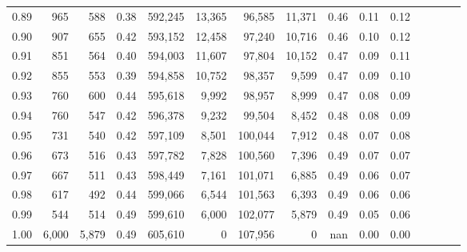 \begin{tabular}{rrrcrrrrrrrrrrr}
0.89 &     965 &    588 &                                       0.38 &  592,245 &   13,365 &   96,585 &   11,371 &  0.46 &  0.11 &                         0.12 \\
0.90 &     907 &    655 &                                       0.42 &  593,152 &   12,458 &   97,240 &   10,716 &  0.46 &  0.10 &                         0.12 \\
0.91 &     851 &    564 &                                       0.40 &  594,003 &   11,607 &   97,804 &   10,152 &  0.47 &  0.09 &                         0.11 \\
0.92 &     855 &    553 &                                       0.39 &  594,858 &   10,752 &   98,357 &    9,599 &  0.47 &  0.09 &                         0.10 \\
0.93 &     760 &    600 &                                       0.44 &  595,618 &    9,992 &   98,957 &    8,999 &  0.47 &  0.08 &                         0.09 \\
0.94 &     760 &    547 &                                       0.42 &  596,378 &    9,232 &   99,504 &    8,452 &  0.48 &  0.08 &                         0.09 \\
0.95 &     731 &    540 &                                       0.42 &  597,109 &    8,501 &  100,044 &    7,912 &  0.48 &  0.07 &                         0.08 \\
0.96 &     673 &    516 &                                       0.43 &  597,782 &    7,828 &  100,560 &    7,396 &  0.49 &  0.07 &                         0.07 \\
0.97 &     667 &    511 &                                       0.43 &  598,449 &    7,161 &  101,071 &    6,885 &  0.49 &  0.06 &                         0.07 \\
0.98 &     617 &    492 &                                       0.44 &  599,066 &    6,544 &  101,563 &    6,393 &  0.49 &  0.06 &                         0.06 \\
0.99 &     544 &    514 &                                       0.49 &  599,610 &    6,000 &  102,077 &    5,879 &  0.49 &  0.05 &                         0.06 \\
1.00 &   6,000 &  5,879 &                                       0.49 &  605,610 &        0 &  107,956 &        0 &   nan &  0.00 &                         0.00 \\
\bottomrule
\end{tabular}
